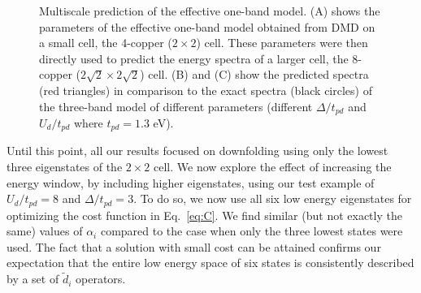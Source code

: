 \begin{figure}[hbt]
\begin{minipage}{0.57\linewidth}
\end{minipage}
\caption{Multiscale prediction of the effective one-band model. (A) shows the parameters of the effective one-band model obtained from DMD on a small cell, the 4-copper ($2\times2$) cell. 
These parameters were then directly used to predict the energy spectra of a larger cell, the 8-copper ($2\sqrt{2} \times 2\sqrt{2}$) cell. (B) and (C) show the predicted spectra (red triangles) 
in comparison to the exact spectra (black circles) of the three-band model of different parameters (different $\Delta/t_{pd}$ and $U_d/t_{pd}$ where $t_{pd}=1.3$ eV). }
\label{fig:predictivity}
\end{figure} 

Until this point, all our results focused on downfolding using only the lowest three eigenstates of the $2\times2$ cell. 
We now explore the effect of increasing the energy window, by including higher eigenstates, using our 
test example of $U_d/t_{pd}=8$ and $\Delta/t_{pd}=3$. To do so, we now use 
all six low energy eigenstates for optimizing the cost function in Eq.~\eqref{eq:C}. We 
find similar (but not exactly the same) values of $\alpha_i$ compared to 
the case when only the three lowest states were used. The fact that a solution with small cost can be attained 
confirms our expectation that the entire low energy space of six states is consistently 
described by a set of $\tilde{d}_i$ operators. 

